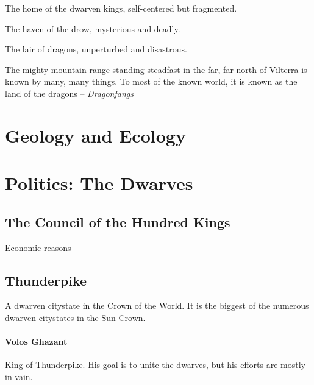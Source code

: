 \documentclass[../main.tex]{subfiles}
\begin{document}
The home of the dwarven kings, self-centered but fragmented.

The haven of the drow, mysterious and deadly.

The lair of dragons, unperturbed and disastrous.

The mighty mountain range standing steadfast in the far,
far north of Vilterra is known by many, many things. To
most of the known world, it is known as the land of the
dragons -- \emph{Dragonfangs}

\section{Geology and Ecology}


\section{Politics: The Dwarves}

\subsection{The Council of the Hundred Kings}
Economic reasons

\subsection{Thunderpike}
A dwarven citystate in the Crown of the World. It is the
biggest of the numerous dwarven citystates in the
Sun Crown.

\paragraph{Volos Ghazant}
King of Thunderpike. His goal is to unite the dwarves, but
his efforts are mostly in vain.
\end{document}
